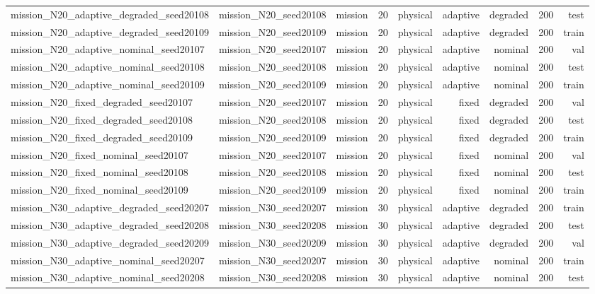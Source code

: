 \begin{tabular}{lrrrrrrrr}
mission\_N20\_adaptive\_degraded\_seed20108 & mission\_N20\_seed20108 & mission & 20 & physical & adaptive & degraded & 200 & test \\
mission\_N20\_adaptive\_degraded\_seed20109 & mission\_N20\_seed20109 & mission & 20 & physical & adaptive & degraded & 200 & train \\
mission\_N20\_adaptive\_nominal\_seed20107 & mission\_N20\_seed20107 & mission & 20 & physical & adaptive & nominal & 200 & val \\
mission\_N20\_adaptive\_nominal\_seed20108 & mission\_N20\_seed20108 & mission & 20 & physical & adaptive & nominal & 200 & test \\
mission\_N20\_adaptive\_nominal\_seed20109 & mission\_N20\_seed20109 & mission & 20 & physical & adaptive & nominal & 200 & train \\
mission\_N20\_fixed\_degraded\_seed20107 & mission\_N20\_seed20107 & mission & 20 & physical & fixed & degraded & 200 & val \\
mission\_N20\_fixed\_degraded\_seed20108 & mission\_N20\_seed20108 & mission & 20 & physical & fixed & degraded & 200 & test \\
mission\_N20\_fixed\_degraded\_seed20109 & mission\_N20\_seed20109 & mission & 20 & physical & fixed & degraded & 200 & train \\
mission\_N20\_fixed\_nominal\_seed20107 & mission\_N20\_seed20107 & mission & 20 & physical & fixed & nominal & 200 & val \\
mission\_N20\_fixed\_nominal\_seed20108 & mission\_N20\_seed20108 & mission & 20 & physical & fixed & nominal & 200 & test \\
mission\_N20\_fixed\_nominal\_seed20109 & mission\_N20\_seed20109 & mission & 20 & physical & fixed & nominal & 200 & train \\
mission\_N30\_adaptive\_degraded\_seed20207 & mission\_N30\_seed20207 & mission & 30 & physical & adaptive & degraded & 200 & train \\
mission\_N30\_adaptive\_degraded\_seed20208 & mission\_N30\_seed20208 & mission & 30 & physical & adaptive & degraded & 200 & test \\
mission\_N30\_adaptive\_degraded\_seed20209 & mission\_N30\_seed20209 & mission & 30 & physical & adaptive & degraded & 200 & val \\
mission\_N30\_adaptive\_nominal\_seed20207 & mission\_N30\_seed20207 & mission & 30 & physical & adaptive & nominal & 200 & train \\
mission\_N30\_adaptive\_nominal\_seed20208 & mission\_N30\_seed20208 & mission & 30 & physical & adaptive & nominal & 200 & test \\

\end{tabular}
